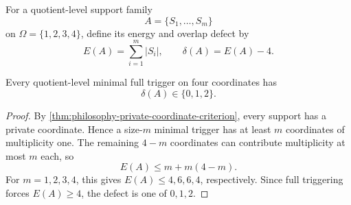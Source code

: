 \begin{definition}
\label{def:philosophy-minimal-trigger-overlap-defect}
For a quotient-level support family
$$
  A=\{S_{1},\ldots,S_{m}\}
$$
on $\Omega=\{1,2,3,4\}$, define its energy and overlap defect by
$$
  E(A)=\sum_{i=1}^{m}|S_{i}|,
  \qquad
  \delta(A)=E(A)-4.
$$
\end{definition}

\begin{theorem}
\label{thm:philosophy-minimal-trigger-defect-range}
Every quotient-level minimal full trigger on four coordinates has
$$
  \delta(A)\in\{0,1,2\}.
$$
\end{theorem}
\begin{proof}
By \autoref{thm:philosophy-private-coordinate-criterion}, every support
has a private coordinate. Hence a size-$m$ minimal trigger has at least
$m$ coordinates of multiplicity one. The remaining $4-m$ coordinates
can contribute multiplicity at most $m$ each, so
$$
  E(A)\leq m+m(4-m).
$$
For $m=1,2,3,4$, this gives $E(A)\leq4,6,6,4$, respectively. Since
full triggering forces $E(A)\geq4$, the defect is one of $0,1,2$.
\end{proof}

